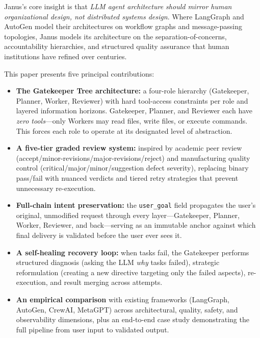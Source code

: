 \documentclass[11pt,a4paper]{article}
\begin{document}
Janus's core insight is that \emph{LLM agent architecture should mirror human
organizational design, not distributed systems design}.
Where LangGraph and AutoGen model their architectures on workflow graphs and
message-passing topologies, Janus models its architecture on the
separation-of-concerns, accountability hierarchies, and structured quality
assurance that human institutions have refined over centuries.

This paper presents five principal contributions:

\begin{itemize}[leftmargin=*,itemsep=2pt]
    \item \textbf{The Gatekeeper Tree architecture:} a four-role hierarchy
    (Gatekeeper, Planner, Worker, Reviewer) with hard tool-access constraints
    per role and layered information horizons. Gatekeeper, Planner, and
    Reviewer each have \emph{zero tools}---only Workers may read files, write
    files, or execute commands. This forces each role to operate at its
    designated level of abstraction.

    \item \textbf{A five-tier graded review system:} inspired by academic peer
    review (accept/minor-revisions/major-revisions/reject) and manufacturing
    quality control (critical/major/minor/suggestion defect severity),
    replacing binary pass/fail with nuanced verdicts and tiered retry
    strategies that prevent unnecessary re-execution.

    \item \textbf{Full-chain intent preservation:} the \texttt{user\_goal}
    field propagates the user's original, unmodified request through every
    layer---Gatekeeper, Planner, Worker, Reviewer, and back---serving as an
    immutable anchor against which final delivery is validated before the
    user ever sees it.

    \item \textbf{A self-healing recovery loop:} when tasks fail, the
    Gatekeeper performs structured diagnosis (asking the LLM \emph{why} tasks
    failed), strategic reformulation (creating a new directive targeting only
    the failed aspects), re-execution, and result merging across attempts.

    \item \textbf{An empirical comparison} with existing frameworks
    (LangGraph, AutoGen, CrewAI, MetaGPT) across architectural, quality,
    safety, and observability dimensions, plus an end-to-end case study
    demonstrating the full pipeline from user input to validated output.
\end{itemize}
\end{document}
